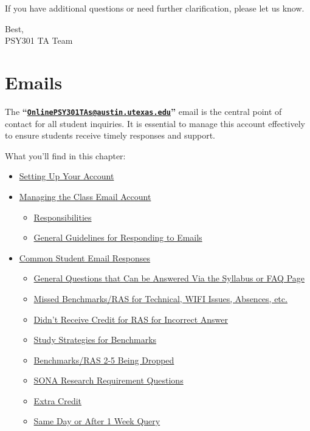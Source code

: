 \documentclass[
]{article}
\providecommand{\tightlist}{%
  \setlength{\itemsep}{0pt}\setlength{\parskip}{0pt}}
\begin{document}
If you have additional questions or need further clarification, please let us know.

Best,\\
PSY301 TA Team

\hypertarget{emails}{%
\section{Emails}\label{emails}}

The \textbf{``\href{mailto:OnlinePSY301TAs@austin.utexas.edu}{\nolinkurl{OnlinePSY301TAs@austin.utexas.edu}}''} email is the central point of contact for all student inquiries. It is essential to manage this account effectively to ensure students receive timely responses and support.

What you'll find in this chapter:

\begin{itemize}
\tightlist
\item
  \protect\hyperlink{setting-up-your-account}{Setting Up Your Account}
\item
  \protect\hyperlink{managing-the-class-email-account}{Managing the Class Email Account}

  \begin{itemize}
  \tightlist
  \item
    \protect\hyperlink{responsibilities}{Responsibilities}
  \item
    \protect\hyperlink{general-guidelines-for-responding-to-emails}{General Guidelines for Responding to Emails}
  \end{itemize}
\item
  \protect\hyperlink{common-student-email-responses}{Common Student Email Responses}

  \begin{itemize}
  \tightlist
  \item
    \protect\hyperlink{general-questions}{General Questions that Can be Answered Via the Syllabus or FAQ Page}
  \item
    \protect\hyperlink{missed-benchmarks}{Missed Benchmarks/RAS for Technical, WIFI Issues, Absences, etc.}
  \item
    \protect\hyperlink{didnt-receive-credit}{Didn't Receive Credit for RAS for Incorrect Answer}
  \item
    \protect\hyperlink{study-strategies}{Study Strategies for Benchmarks}
  \item
    \protect\hyperlink{benchmarks-ras-dropped}{Benchmarks/RAS 2-5 Being Dropped}
  \item
    \protect\hyperlink{sona-research}{SONA Research Requirement Questions}
  \item
    \protect\hyperlink{extra-credit}{Extra Credit}
  \item
    \protect\hyperlink{same-day-query}{Same Day or After 1 Week Query}
  \end{itemize}
\end{itemize}
\end{document}
